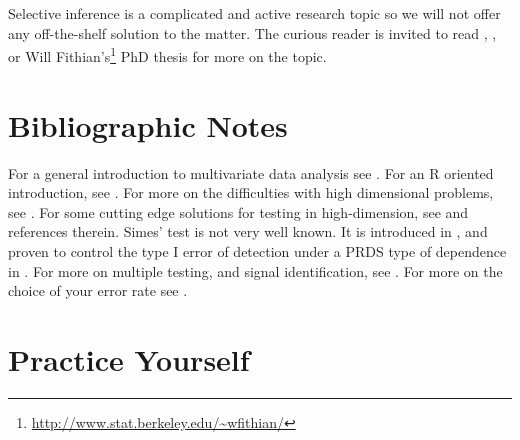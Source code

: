 \documentclass[]{book}
\renewcommand{\href}[2]{#2\footnote{\url{#1}}}
\theoremstyle{definition}
\theoremstyle{definition}
\theoremstyle{definition}
\theoremstyle{remark}
\begin{document}
Selective inference is a complicated and active research topic so we will not offer any off-the-shelf solution to the matter.
The curious reader is invited to read \citet{rosenblatt2014selective}, \citet{javanmard2014confidence}, or \href{http://www.stat.berkeley.edu/~wfithian/}{Will Fithian's} PhD thesis \citep{fithian2015topics} for more on the topic.

\hypertarget{bibliographic-notes-7}{%
\section{Bibliographic Notes}\label{bibliographic-notes-7}}

For a general introduction to multivariate data analysis see \citet{anderson2004introduction}.
For an R oriented introduction, see \citet{everitt2011introduction}.
For more on the difficulties with high dimensional problems, see \citet{bai1996effect}.
For some cutting edge solutions for testing in high-dimension, see \citet{rosenblatt2016better} and references therein.
Simes' test is not very well known. It is introduced in \citet{simes1986improved}, and proven to control the type I error of detection under a PRDS type of dependence in \citet{benjamini2001control}.
For more on multiple testing, and signal identification, see \citet{goeman2014multiple}.
For more on the choice of your error rate see \citet{rosenblatt2013practitioner}.

\hypertarget{practice-yourself-5}{%
\section{Practice Yourself}\label{practice-yourself-5}}
\end{document}
